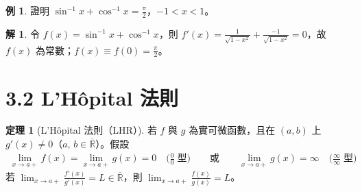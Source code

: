 \documentclass[12pt]{extarticle}
\newcommand{\ds}{\displaystyle}
\theoremstyle{definition}
\newtheorem*{thm}{定理}
\newtheorem*{ex}{例}
\newtheorem*{sol}{解}
\begin{document}
\begin{ex}
  證明 $\ds\sin^{-1}x + \cos^{-1}x = \frac{\pi}{2}$，$\ds -1 < x < 1$。
\end{ex}

\begin{sol}
  令 $\ds f(x) = \sin^{-1}x + \cos^{-1}x$，則 $\ds f'(x) = \frac{1}{\sqrt{1 - x^2}} + \frac{-1}{\sqrt{1 - x^2}} = 0$，故 $f(x)$ 為常數；$\ds f(x)\equiv f(0) = \frac{\pi}{2}$。   
\end{sol}

\section*{3.2 L'H\^opital 法則}


\begin{thm}[L'H\^opital 法則（LHR）]
  若 $f$ 與 $g$ 為實可微函數，且在 $(a, b)$ 上 $g'(x)\ne 0$（$a,\,b\in\overline{\mathbb{R}}$）。假設 
  \begin{align*}
    \lim_{x\to a+}f(x) = \lim_{x\to a+}g(x) = 0\quad\Big(\frac{0}{0}\;\text{型}\Big)\qquad\text{或}\qquad\lim_{x\to a+}g(x) = \infty\quad\Big(\frac{\infty}{\infty}\;\text{型}\Big)
  \end{align*}
  若 $\ds\lim_{x\to a+}\frac{f'(x)}{g'(x)} = L\in\overline{\mathbb{R}}$，則 $\ds\lim_{x\to a+}\frac{f(x)}{g(x)} = L$。
\end{thm}
\end{document}
